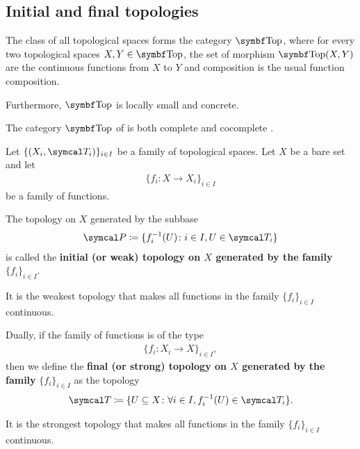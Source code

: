 \subsection{Initial and final topologies}\label{subsec:initial_final_topologies}

\begin{definition}\label{def:category_of_topological_spaces}
  The class of all topological spaces forms the category \( \Bold{Top} \), where for every two topological spaces \( X, Y \in \Bold{Top} \), the set of morphism \( \Bold{Top}(X, Y) \) are the continuous functions from \( X \) to \( Y \) and composition is the usual function composition.

  Furthermore, \( \Bold{Top} \) is locally small and concrete.
\end{definition}

\begin{theorem}\label{thm:top_complete_cocomplete}
  The category \( \Bold{Top} \) of is both complete  and cocomplete .
\end{theorem}

\begin{definition}\label{def:initial_topology}\cite{nLab:top}
  Let \( \{ (X_i, \Cal{T}_i) \}_{i \in I} \) be a family of topological spaces. Let \( X \) be a bare set and let
  \begin{align*}
    \{ f_i: X \to X_i \}_{i \in I}
  \end{align*}
  be a family of functions.

  The topology on \( X \) generated by the subbase
  \begin{align*}
    \Cal{P} \coloneqq \{ f_i^{-1}(U) \colon i \in I, U \in \Cal{T}_i \}
  \end{align*}
  is called the \textbf{initial (or weak) topology on \( X \) generated by the family} \( \{ f_i \}_{i \in I} \).

  It is the weakest topology that makes all functions in the family \( \{ f_i \}_{i \in I} \) continuous.
\end{definition}

\begin{definition}\label{def:final_topology}\cite{nLab:top}
  Dually, if the family of functions is of the type
  \begin{align*}
    \{ f_i: X_i \to X \}_{i \in I},
  \end{align*}
  then we define the \textbf{final (or strong) topology on \( X \) generated by the family} \( \{ f_i \}_{i \in I} \) as the topology
  \begin{align*}
    \Cal{T} \coloneqq \{ U \subseteq X \colon \forall i \in I, f_i^{-1}(U) \in \Cal{T}_i \}.
  \end{align*}

  It is the strongest topology that makes all functions in the family \( \{ f_i \}_{i \in I} \) continuous.
\end{definition}

